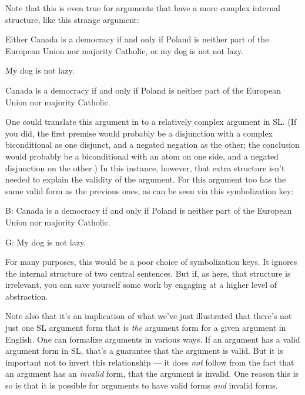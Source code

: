 Note that this is even true for arguments that have a more complex internal structure, like this strange argument:

\begin{earg}
\item Either Canada is a democracy if and only if Poland is neither part of the European Union nor majority Catholic, or my dog is not not lazy.
\item My dog is not lazy.
\item[\therefore] Canada is a democracy if and only if Poland is neither part of the European Union nor majority Catholic.
\end{earg}

One could translate this argument in to a relatively complex argument in SL. (If you did, the first premise would probably be a disjunction with a complex biconditional as one disjunct, and a negated negation as the other; the conclusion would probably be a biconditional with an atom on one side, and a negated disjunction on the other.) In this instance, however, that extra structure isn't needed to explain the validity of the argument. For this argument too has the same valid form as the previous ones, as can be seen via this symbolization key:

\begin{ekey}
\item[B:] Canada is a democracy if and only if Poland is neither part of the European Union nor majority Catholic.
\item[G:] My dog is not lazy.
\end{ekey}

For many purposes, this would be a poor choice of symbolization keys. It ignores the internal structure of two central sentences. But if, as here, that structure is irrelevant, you can save yourself some work by engaging at a higher level of abstraction.

Note also that it's an implication of what we've just illustrated that there's not just one SL argument form that is \emph{the} argument form for a given argument in English. One can formalize arguments in various ways. If an argument has a valid argument form in SL, that's a guarantee that the argument is valid. But it is important not to invert this relationship --- it does \emph{not} follow from the fact that an argument has an \emph{invalid} form, that the argument is invalid. One reason this is so is that it is possible for arguments to have valid forms \emph{and} invalid forms.

